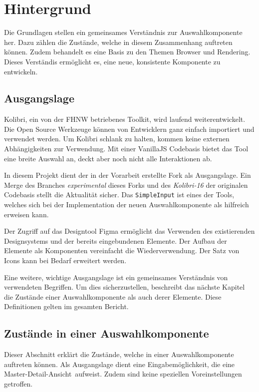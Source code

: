 \chapter{Hintergrund}
\label{chap:background}

Die Grundlagen stellen ein gemeinsames Verständnis zur Auswahlkomponente her.
Dazu zählen die Zustände, welche in diesem Zusammenhang auftreten können.
Zudem behandelt es eine Basis zu den Themen Browser und Rendering. 
Dieses Verständis ermöglicht es, eine neue, konsistente Komponente zu entwickeln.


\section{Ausgangslage}
\label{sec:basics}

Kolibri, ein von der FHNW betriebenes Toolkit, wird laufend weiterentwickelt.
Die Open Source Werkzeuge können von Entwicklern ganz einfach importiert und verwendet werden.
Um Kolibri schlank zu halten, kommen keine externen Abhängigkeiten zur Verwendung.
Mit einer VanillaJS Codebasis bietet das Tool eine breite Auswahl an, deckt aber noch nicht alle Interaktionen ab.

In diesem Projekt dient der in der Vorarbeit erstellte Fork als Ausgangslage.
Ein Merge des Branches \emph{experimental} dieses Forks und des \emph{Kolibri-16} der originalen Codebasis stellt die Aktualität sicher.
Das \texttt{SimpleInput} ist eines der Tools, welches sich bei der Implementation der neuen Auswahlkomponente als hilfreich erweisen kann.

Der Zugriff auf das Designtool Figma ermöglicht das Verwenden des existierenden Designsystems und der bereits eingebundenen Elemente. 
Der Aufbau der Elemente als Komponenten vereinfacht die Wiederverwendung. 
Der Satz von Icons kann bei Bedarf erweitert werden.

Eine weitere, wichtige Ausgangslage ist ein gemeinsames Verständnis von verwendeten Begriffen. 
Um dies sicherzustellen, beschreibt das nächste Kapitel die Zustände einer Auswahlkomponente als auch derer Elemente.
Diese Definitionen gelten im gesamten Bericht.


\section{Zustände in einer Auswahlkomponente}
\label{sec:states}

Dieser Abschnitt erklärt die Zustände, welche in einer Auswahlkomponente auftreten können.
Als Ausgangslage dient eine Eingabemöglichkeit, die eine Master-Detail-Ansicht\footnotemark \ aufweist.
Zudem sind keine speziellen Voreinstellungen getroffen.


